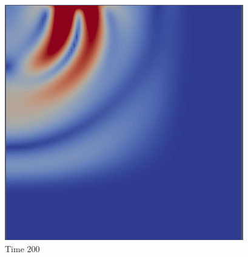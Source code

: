 \begin{figure}[H]
\begin{minipage}{.5\textwidth}
  \includegraphics[width=1.\linewidth]{images/Lamb3.png}
  \caption{Time $200$}
  \label{fig:Lamb2}
\end{minipage}
\end{figure} 

